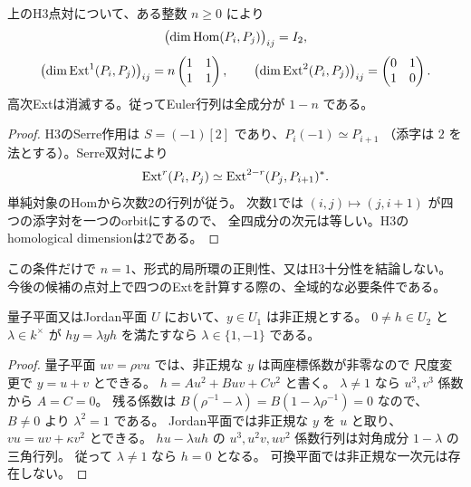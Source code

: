 \begin{corollary}[二周期点対のExtに対する必要条件]
\label{cor:h3-order2-cycle-ext}
上のH3点対について、ある整数 $n\ge0$ により
\[
 \bigl(\dim\operatorname{Hom}(P_i,P_j)\bigr)_{ij}=I_2,
\]
\[
 \bigl(\dim\operatorname{Ext}^1(P_i,P_j)\bigr)_{ij}
   =n\begin{pmatrix}1&1\\1&1\end{pmatrix},\qquad
 \bigl(\dim\operatorname{Ext}^2(P_i,P_j)\bigr)_{ij}
   =\begin{pmatrix}0&1\\1&0\end{pmatrix}.
\]
高次Extは消滅する。従ってEuler行列は全成分が $1-n$ である。
\end{corollary}
\begin{proof}
H3のSerre作用は $S=(-1)[2]$ であり、$P_i(-1)\simeq P_{i+1}$
（添字は $2$ を法とする）。Serre双対により
\[
 \operatorname{Ext}^r(P_i,P_j)\simeq
 \operatorname{Ext}^{2-r}(P_j,P_{i+1})^*.
\]
単純対象のHomから次数2の行列が従う。
次数1では $(i,j)\mapsto(j,i+1)$ が四つの添字対を一つのorbitにするので、
全四成分の次元は等しい。H3のhomological dimensionは2である。
\end{proof}
この条件だけで $n=1$、形式的局所環の正則性、又はH3十分性を結論しない。
今後の候補の点対上で四つのExtを計算する際の、全域的な必要条件である。

\begin{lemma}[AS2の非正規一次元の二次正規化]
\label{lem:h3-binary-nonnormal-quadratic-normalizer}
量子平面又はJordan平面 $U$ において、$y\in U_1$ は非正規とする。
$0\ne h\in U_2$ と $\lambda\in k^\times$ が
$hy=\lambda yh$ を満たすなら $\lambda\in\{1,-1\}$ である。
\end{lemma}
\begin{proof}
量子平面 $uv=\rho vu$ では、非正規な $y$ は両座標係数が非零なので
尺度変更で $y=u+v$ とできる。
$h=A u^2+Buv+C v^2$ と書く。
$\lambda\ne1$ なら $u^3,v^3$ 係数から $A=C=0$。
残る係数は $B(\rho^{-1}-\lambda)=B(1-\lambda\rho^{-1})=0$ なので、
$B\ne0$ より $\lambda^2=1$ である。
Jordan平面では非正規な $y$ を $u$ と取り、
$vu=uv+\kappa v^2$ とできる。
$hu-\lambda uh$ の $u^3,u^2v,uv^2$ 係数行列は対角成分 $1-\lambda$ の三角行列。
従って $\lambda\ne1$ なら $h=0$ となる。
可換平面では非正規な一次元は存在しない。
\end{proof}

